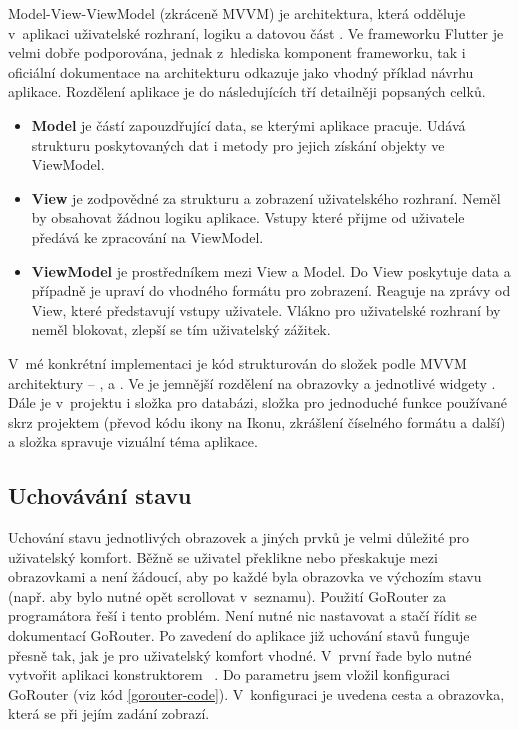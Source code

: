 \documentclass[
  biblatex,
  figures=true,
  tables=false,
  glossaries,
  index
]{kidiplom}
\begin{document}
Model-View-ViewModel (zkráceně MVVM) je architektura, která odděluje v~aplikaci uživatelské rozhraní, logiku a datovou část \cite{mvvm}. Ve frameworku Flutter je velmi dobře podporována, jednak z~hlediska komponent frameworku, tak i oficiální dokumentace na architekturu odkazuje jako vhodný příklad návrhu aplikace. Rozdělení aplikace je do následujících tří detailněji popsaných celků.
\begin{itemize}
  \item \textbf{Model} je částí zapouzdřující data, se kterými aplikace pracuje. Udává strukturu poskytovaných dat i metody pro jejich získání objekty ve ViewModel.
  \item \textbf{View} je zodpovědné za strukturu a zobrazení uživatelského rozhraní. Neměl by obsahovat žádnou logiku aplikace. Vstupy které přijme od uživatele předává ke zpracování na ViewModel. 
  \item \textbf{ViewModel} je prostředníkem mezi View a Model. Do View poskytuje data a případně je upraví do vhodného formátu pro zobrazení. Reaguje na zprávy od View, které představují vstupy uživatele. Vlákno pro uživatelské rozhraní by neměl blokovat, zlepší se tím uživatelský zážitek.
\end{itemize}

V~mé konkrétní implementaci je kód strukturován do složek podle MVVM architektury -- ,  a . Ve  je jemnější rozdělení na obrazovky  a jednotlivé widgety . Dále je v~projektu i složka  pro databázi, složka  pro jednoduché funkce používané skrz projektem (převod kódu ikony na Ikonu, zkrášlení číselného formátu a další) a složka  spravuje vizuální téma aplikace.

\subsection{Uchovávání stavu}
Uchování stavu jednotlivých obrazovek a jiných prvků je velmi důležité pro uživatelský komfort. Běžně se uživatel překlikne nebo přeskakuje mezi obrazovkami a není žádoucí, aby po každé byla obrazovka ve výchozím stavu (např. aby bylo nutné opět scrollovat v~seznamu). Použití GoRouter za programátora řeší i tento problém. Není nutné nic nastavovat a stačí řídit se dokumentací GoRouter. Po zavedení do aplikace již uchování stavů funguje přesně tak, jak je pro uživatelský komfort vhodné. V~první řade bylo nutné vytvořit aplikaci konstruktorem ~. Do parametru  jsem vložil konfiguraci GoRouter (viz kód \ref{gorouter-code}). V~konfiguraci je uvedena cesta a obrazovka, která se při jejím zadání zobrazí.
\end{document}
